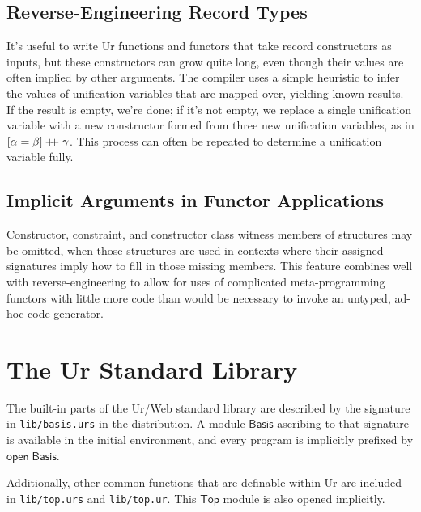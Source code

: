 \documentclass{article}
\newcommand{\mt}[1]{\mathsf{#1}}
\newcommand{\rc}{+ \hspace{-.075in} + \;}
\begin{document}
\subsection{Reverse-Engineering Record Types}

It's useful to write Ur functions and functors that take record constructors as inputs, but these constructors can grow quite long, even though their values are often implied by other arguments.  The compiler uses a simple heuristic to infer the values of unification variables that are mapped over, yielding known results.  If the result is empty, we're done; if it's not empty, we replace a single unification variable with a new constructor formed from three new unification variables, as in $[\alpha = \beta] \rc \gamma$.  This process can often be repeated to determine a unification variable fully.

\subsection{Implicit Arguments in Functor Applications}

Constructor, constraint, and constructor class witness members of structures may be omitted, when those structures are used in contexts where their assigned signatures imply how to fill in those missing members.  This feature combines well with reverse-engineering to allow for uses of complicated meta-programming functors with little more code than would be necessary to invoke an untyped, ad-hoc code generator.


\section{The Ur Standard Library}

The built-in parts of the Ur/Web standard library are described by the signature in \texttt{lib/basis.urs} in the distribution.  A module $\mt{Basis}$ ascribing to that signature is available in the initial environment, and every program is implicitly prefixed by $\mt{open} \; \mt{Basis}$.

Additionally, other common functions that are definable within Ur are included in \texttt{lib/top.urs} and \texttt{lib/top.ur}.  This $\mt{Top}$ module is also opened implicitly.
\end{document}
